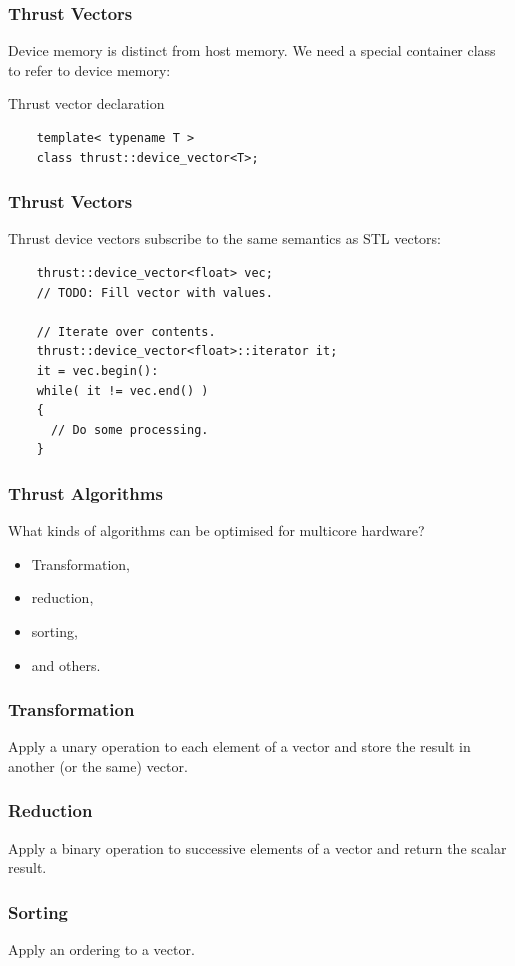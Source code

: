 \documentclass{beamer}
\begin{document}
\begin{frame}[fragile]
  \frametitle{Thrust Vectors}
  Device memory is distinct from host memory. We need a special
  container class to refer to device memory:
  \begin{block}{Thrust vector declaration}
    \begin{lstlisting}
    template< typename T >
    class thrust::device_vector<T>;
    \end{lstlisting}
  \end{block}
\end{frame}

\begin{frame}[fragile]
  \frametitle{Thrust Vectors}
  Thrust device vectors subscribe to the same semantics as STL
  vectors:
  \begin{example}
    \begin{lstlisting}
    thrust::device_vector<float> vec;
    // TODO: Fill vector with values.

    // Iterate over contents.
    thrust::device_vector<float>::iterator it;
    it = vec.begin():
    while( it != vec.end() )
    {
      // Do some processing.
    }
    \end{lstlisting}
  \end{example}
\end{frame}

\begin{frame}
  \frametitle{Thrust Algorithms}
  What kinds of algorithms can be optimised for multicore hardware?
  \begin{itemize}
    \item Transformation,
    \item reduction,
    \item sorting,
    \item and others.
  \end{itemize}
\end{frame}

\begin{frame}[fragile]
  \frametitle{Transformation}
  Apply a unary operation to each element of a vector and store the
  result in another (or the same) vector.
\end{frame}

\begin{frame}[fragile]
  \frametitle{Reduction}
  Apply a binary operation to successive elements of a vector and return
  the scalar result.
\end{frame}

\begin{frame}[fragile]
  \frametitle{Sorting}
  Apply an ordering to a vector.
\end{frame}
\end{document}
